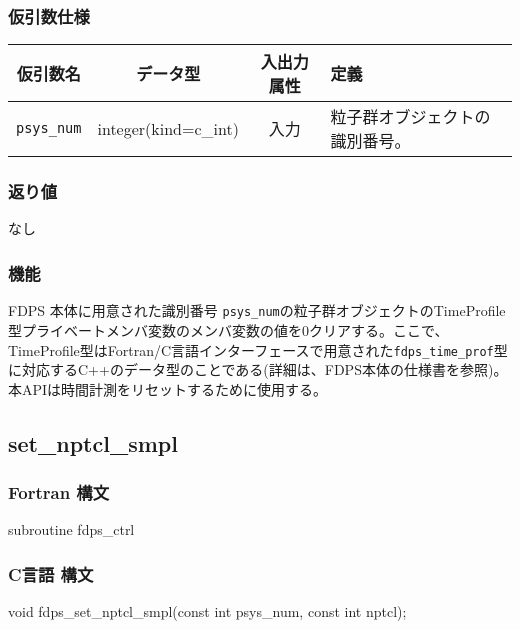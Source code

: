 \subsubsection*{仮引数仕様}
\begin{table}[h]
\begin{tabularx}{\linewidth}{cccX}
\toprule
\rowcolor{Snow2}
仮引数名 & データ型 & 入出力属性 & 定義 \\
\midrule
\texttt{psys\_num} & integer(kind=c\_int) & 入力 & 粒子群オブジェクトの識別番号。\\
\bottomrule
\end{tabularx}
\end{table}

\subsubsection*{返り値}
なし

\subsubsection*{機能}
FDPS 本体に用意された識別番号 \texttt{psys\_num}の粒子群オブジェクトのTimeProfile型プライベートメンバ変数のメンバ変数の値を0クリアする。ここで、TimeProfile型はFortran/C言語インターフェースで用意された\texttt{fdps\_time\_prof}型に対応するC++のデータ型のことである(詳細は、FDPS本体の仕様書を参照)。本APIは時間計測をリセットするために使用する。

\clearpage

\subsection{set\_nptcl\_smpl}
\subsubsection*{Fortran 構文}
\begin{screen}
\begin{spverbatim}
subroutine fdps_ctrl%
\end{spverbatim}
\end{screen}

\subsubsection*{C言語 構文}
\begin{screen}
\begin{spverbatim}
void fdps_set_nptcl_smpl(const int psys_num,
                         const int nptcl);
\end{spverbatim}
\end{screen}

